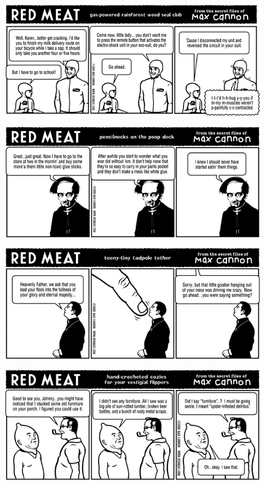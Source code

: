 \documentclass[a4paper,twoside,11pt]{article}
\begin{document}
\includegraphics[width=\textwidth]{redmeat_2000-09-26.png}



\includegraphics[width=\textwidth]{redmeat_2000-10-03.png}



\includegraphics[width=\textwidth]{redmeat_2000-10-10.png}



\includegraphics[width=\textwidth]{redmeat_2000-10-17.png}
\end{document}
